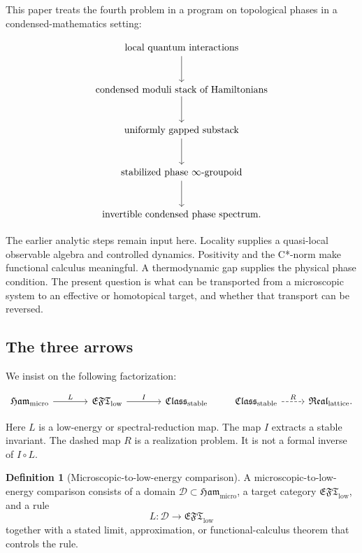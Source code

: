 \documentclass[12pt]{article}
\theoremstyle{definition}
\newtheorem{definition}[theorem]{Definition}
\theoremstyle{remark}
\newcommand{\Ham}{\mathfrak{Ham}}
\newcommand{\EFT}{\mathfrak{EFT}}
\newcommand{\Class}{\mathfrak{Class}}
\newcommand{\Real}{\mathfrak{Real}}
\begin{document}
This paper treats the fourth problem in a program on topological phases in a
condensed-mathematics setting:

\[
\begin{tikzcd}[row sep=large]
\text{local quantum interactions}
  \arrow[d]
\\
\text{condensed moduli stack of Hamiltonians}
  \arrow[d]
\\
\text{uniformly gapped substack}
  \arrow[d]
\\
\text{stabilized phase }\infty\text{-groupoid}
  \arrow[d]
\\
\text{invertible condensed phase spectrum.}
\end{tikzcd}
\]

The earlier analytic steps remain input here.
Locality supplies a quasi-local observable algebra and controlled dynamics.
Positivity and the C*-norm make functional calculus meaningful.
A thermodynamic gap supplies the physical phase condition.
The present question is what can be transported from a microscopic system to
an effective or homotopical target, and whether that transport can be
reversed.

\subsection{The three arrows}

We insist on the following factorization:

\[
\begin{tikzcd}[column sep=large]
\Ham_{\mathrm{micro}}
  \arrow[r,"L"]
&
\EFT_{\mathrm{low}}
  \arrow[r,"I"]
&
\Class_{\mathrm{stable}}
\end{tikzcd}
\qquad
\begin{tikzcd}
\Class_{\mathrm{stable}}
  \arrow[r,dashed,"R"]
&
\Real_{\mathrm{lattice}}.
\end{tikzcd}
\]

Here $L$ is a low-energy or spectral-reduction map.
The map $I$ extracts a stable invariant.
The dashed map $R$ is a realization problem.
It is not a formal inverse of $I\circ L$.

\begin{definition}[Microscopic-to-low-energy comparison]
A microscopic-to-low-energy comparison consists of a domain
$\mathcal D\subset\Ham_{\mathrm{micro}}$, a target category
$\EFT_{\mathrm{low}}$, and a rule
\[
L:\mathcal D\longrightarrow\EFT_{\mathrm{low}}
\]
together with a stated limit, approximation, or functional-calculus theorem
that controls the rule.
\end{definition}
\end{document}
